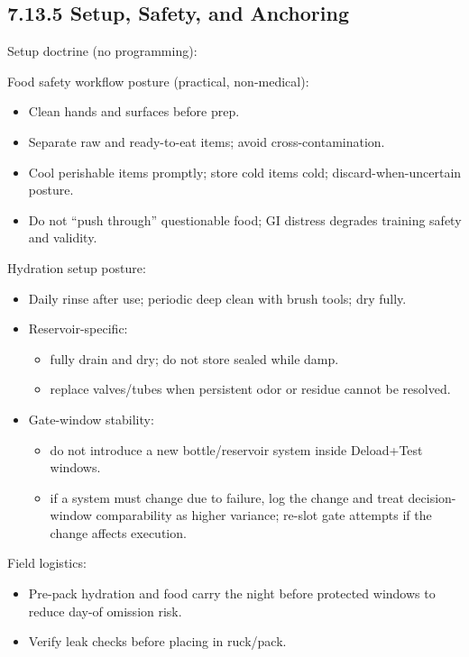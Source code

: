 \documentclass[10pt]{article}
\begin{document}
\subsection*{7.13.5 Setup, Safety, and Anchoring}
{}

Setup doctrine (no programming):

Food safety workflow posture (practical, non-medical):

\begin{itemize}
\item Clean hands and surfaces before prep.
\item Separate raw and ready-to-eat items; avoid cross-contamination.
\item Cool perishable items promptly; store cold items cold; discard-when-uncertain posture.
\item Do not “push through” questionable food; GI distress degrades training safety and validity.
\end{itemize}

Hydration setup posture:

\begin{itemize}
\item Daily rinse after use; periodic deep clean with brush tools; dry fully.
\item Reservoir-specific:
  \begin{itemize}
  \item fully drain and dry; do not store sealed while damp.
  \item replace valves/tubes when persistent odor or residue cannot be resolved.
  \end{itemize}
\item Gate-window stability:
  \begin{itemize}
  \item do not introduce a new bottle/reservoir system inside Deload+Test windows.
  \item if a system must change due to failure, log the change and treat decision-window comparability as higher variance; re-slot gate attempts if the change affects execution.
  \end{itemize}
\end{itemize}

Field logistics:

\begin{itemize}
\item Pre-pack hydration and food carry the night before protected windows to reduce day-of omission risk.
\item Verify leak checks before placing in ruck/pack.
\end{itemize}
\end{document}
